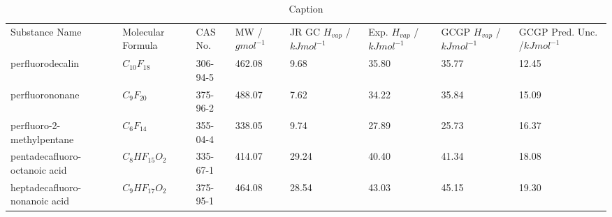 \documentclass[journal=jceaax,manuscript=article]{achemso}
\begin{document}
\begin{table}[H]
\centering
\begin{tabular}{p{2.9cm}p{1.8cm}p{1.6cm}p{1.5cm}p{1.6cm}p{1.6cm}p{1.6cm}p{1.6cm}} 
Substance Name&  Molecular Formula&  CAS No.&  MW /$gmol^{-1}$&  JR GC $H_{vap}$ /$kJmol^{-1}$&  Exp. $H_{vap}$ /$kJmol^{-1}$&  GCGP $H_{vap}$ /$kJmol^{-1}$& GCGP Pred. Unc. /$kJmol^{-1}$ 


\\
         perfluorodecalin&  $C_{10}F_{18}$&  306-94-5&  462.08&  9.68&  35.80&  35.77& 12.45
\\
         perfluorononane&  $C_{9}F_{20}$&  375-96-2&  488.07&  7.62&  34.22&  35.84& 15.09
\\
         perfluoro-2-methylpentane&  $C_{6}F_{14}$&  355-04-4&  338.05&  9.74&  27.89&  25.73& 16.37
\\
         pentadecafluoro-octanoic acid&  $C_{8}HF_{15}O_{2}$&  335-67-1&  414.07&  29.24&  40.40&  41.34& 18.08
\\
         heptadecafluoro-nonanoic acid&  $C_{9}HF_{17}O_{2}$&  375-95-1&  464.08&  28.54&  43.03&  45.15& 19.30
\\
\end{tabular}
\caption{Caption}
\label{tab:my_label}
\end{table}
\end{document}
